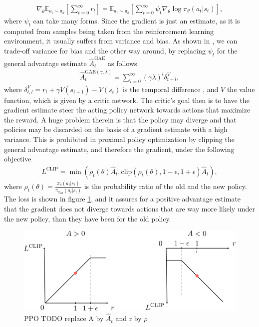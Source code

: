 \begin{align}
	\nabla_\theta\mathbb{E}_{a_t\sim\pi_\theta}\left[\sum_{t=0}^\infty r_t\right] = \mathbb{E}_{a_t\sim\pi_\theta}\left[\sum_{t=0}^\infty\psi_t\nabla_\theta\log\pi_\theta(a_t|s_t)\right],
\end{align}
where $\psi_t$ can take many forms. Since the gradient is just an estimate, as it is computed from samples being taken from the reinforcement learning environment, it usually suffers from variance and bias. As shown in \cite{schulman2015high}, we can trade-off variance for bias and the other way around, by replacing $\psi_t$ for the general advantage estimate $\hat{A}^\text{GAE}_t$ as follows
\begin{align}
	\hat{A}^{\text{GAE}(\gamma,\lambda)}_t = \sum_{l=0}^\infty(\gamma\lambda)^l\delta_{t+l}^V,
	\label{eq::323_gae}
\end{align}
where $\delta^V_{t,l} = r_t + \gamma V(s_{t+1}) - V(s_t)$ is the temporal difference \cite{sutton1998introduction}, and $V$ the value function, which is given by a critic network. The critic's goal then is to have the gradient estimate steer the acting policy network towards actions that maximize the reward. A huge problem therein is that the policy may diverge and that policies may be discarded on the basis of a gradient estimate with a high variance. This is prohibited in proximal policy optimization by clipping the general advantage estimate, and therefore the gradient, under the following objective
\begin{align}
	L^\text{CLIP} = \min(\rho_t(\theta)\hat{A}_t, \text{clip}(\rho_t(\theta), 1-\epsilon, 1+\epsilon)\hat{A}_t),
\end{align}
where $\rho_t(\theta) = \frac{\pi_\theta(a_t|s_t)}{\pi_{\theta_\text{old}}(a_t|s_t)}$ is the probability ratio of the old and the new policy. The loss is shown in figure \ref{fig::323_ppo}, and it assures for a positive advantage estimate that the gradient does not diverge towards actions that are way more likely under the new policy, than they have been for the old policy.
\begin{figure}[h]
	\centering
	\includegraphics[scale=.35]{chapters/03_background/img/ppo_objective.png}
	\caption{PPO TODO replace A by $\hat{A}_t$ and r by $\rho$}
	\label{fig::323_ppo}
\end{figure}
